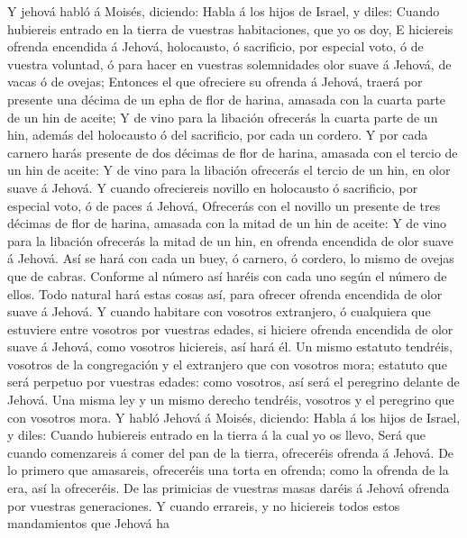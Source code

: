  Y jehová habló á Moisés, diciendo:  Habla á los
hijos de Israel, y diles: Cuando hubiereis entrado en la tierra de
vuestras habitaciones, que yo os doy,  E hiciereis ofrenda
encendida á Jehová, holocausto, ó sacrificio, por especial voto, ó de
vuestra voluntad, ó para hacer en vuestras solemnidades olor suave á
Jehová, de vacas ó de ovejas;  Entonces el que ofreciere su
ofrenda á Jehová, traerá por presente una décima de un epha de flor de
harina, amasada con la cuarta parte de un hin de aceite;  Y
de vino para la libación ofrecerás la cuarta parte de un hin, además del
holocausto ó del sacrificio, por cada un cordero.  Y por
cada carnero harás presente de dos décimas de flor de harina, amasada
con el tercio de un hin de aceite:  Y de vino para la
libación ofrecerás el tercio de un hin, en olor suave á Jehová.
 Y cuando ofreciereis novillo en holocausto ó sacrificio,
por especial voto, ó de paces á Jehová,  Ofrecerás con el
novillo un presente de tres décimas de flor de harina, amasada con la
mitad de un hin de aceite:  Y de vino para la libación
ofrecerás la mitad de un hin, en ofrenda encendida de olor suave á
Jehová.  Así se hará con cada un buey, ó carnero, ó
cordero, lo mismo de ovejas que de cabras.  Conforme al
número así haréis con cada uno según el número de ellos. 
Todo natural hará estas cosas así, para ofrecer ofrenda encendida de
olor suave á Jehová.  Y cuando habitare con vosotros
extranjero, ó cualquiera que estuviere entre vosotros por vuestras
edades, si hiciere ofrenda encendida de olor suave á Jehová, como
vosotros hiciereis, así hará él.  Un mismo estatuto
tendréis, vosotros de la congregación y el extranjero que con vosotros
mora; estatuto que será perpetuo por vuestras edades: como vosotros, así
será el peregrino delante de Jehová.  Una misma ley y un
mismo derecho tendréis, vosotros y el peregrino que con vosotros mora.
 Y habló Jehová á Moisés, diciendo:  Habla á
los hijos de Israel, y diles: Cuando hubiereis entrado en la tierra á la
cual yo os llevo,  Será que cuando comenzareis á comer del
pan de la tierra, ofreceréis ofrenda á Jehová.  De lo
primero que amasareis, ofreceréis una torta en ofrenda; como la ofrenda
de la era, así la ofreceréis.  De las primicias de vuestras
masas daréis á Jehová ofrenda por vuestras generaciones.  Y
cuando errareis, y no hiciereis todos estos mandamientos que Jehová ha
